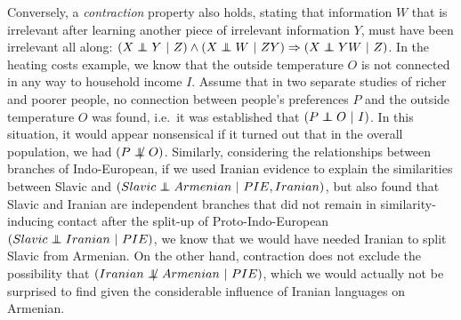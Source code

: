 Conversely, a \textit{contraction} property also holds, stating that information $W$ that is irrelevant after learning another piece of irrelevant information $Y$, must have been irrelevant all along: $(X \independent Y\ |\ Z)  \wedge (X \independent W\ |\ ZY) \Rightarrow (X \independent YW\ |\ Z)$. In the heating costs example, we know that the outside temperature $O$ is not connected in any way to household income $I$. Assume that in two separate studies of richer and poorer people, no connection between people's preferences $P$ and the outside temperature $O$ was found, i.e.\ it was established that $(P \independent O\ |\ I)$. In this situation, it would appear nonsensical if it turned out that in the overall population, we had $(P \notindep O)$. Similarly, considering the relationships between branches of Indo-European, if we used Iranian evidence to explain the similarities between Slavic and  $(
Slavic \independent Armenian\ |\ PIE, Iranian)$, but also found that Slavic and Iranian are independent branches that did not remain in similarity-inducing contact after the split-up of Proto-Indo-European $(Slavic \independent Iranian\ |\ PIE)$, we know that we would have needed Iranian to split Slavic from Armenian. On the other hand, contraction does not exclude the possibility that $(Iranian \notindep Armenian\ |\ PIE)$, which we would actually not be surprised to find given the considerable influence of Iranian languages on Armenian.

